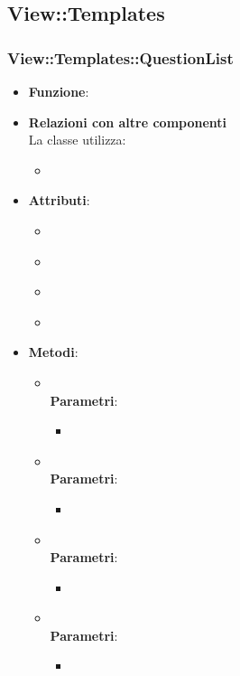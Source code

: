 \subsection{View::Templates}
\subsubsection{View::Templates::QuestionList}
\begin{itemize}
\item\textbf{Funzione}:
\item\textbf{Relazioni con altre componenti}\\
La classe utilizza:
	\begin{itemize}
		\item
	\end{itemize}
\item\textbf{Attributi}:
	\begin{itemize}
		\item\code{}\\
		\item\code{}\\
		\item\code{}\\
		\item\code{}\\
	\end{itemize}
\item\textbf{Metodi}:
	\begin{itemize}
		\item\code{}\\
		\textbf{Parametri}:
			\begin{itemize}
				\item\code{}\\
			\end{itemize}
		\item\code{}\\
		\textbf{Parametri}:
			\begin{itemize}
				\item\code{}\\
			\end{itemize}
		\item\code{}\\
		\textbf{Parametri}:
			\begin{itemize}
				\item\code{}\\
			\end{itemize}
		\item\code{}\\
		\textbf{Parametri}:
			\begin{itemize}
				\item\code{}\\
			\end{itemize}
	\end{itemize}
\end{itemize}

